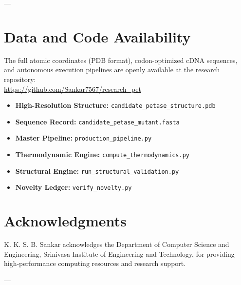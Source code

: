 \documentclass[10pt,twocolumn,a4paper]{article}
\begin{document}
---

\section*{Data and Code Availability}
The full atomic coordinates (PDB format), codon-optimized cDNA sequences, and autonomous execution pipelines are openly available at the research repository: \\
\url{https://github.com/Sankar7567/research_pet}
\begin{itemize}
    \item \textbf{High-Resolution Structure:} \texttt{candidate\_petase\_structure.pdb}
    \item \textbf{Sequence Record:} \texttt{candidate\_petase\_mutant.fasta}
    \item \textbf{Master Pipeline:} \texttt{production\_pipeline.py}
    \item \textbf{Thermodynamic Engine:} \texttt{compute\_thermodynamics.py}
    \item \textbf{Structural Engine:} \texttt{run\_structural_validation.py}
    \item \textbf{Novelty Ledger:} \texttt{verify\_novelty.py}
\end{itemize}

\section*{Acknowledgments}
K. K. S. B. Sankar acknowledges the Department of Computer Science and Engineering, Srinivasa Institute of Engineering and Technology, for providing high-performance computing resources and research support.

---
\end{document}
